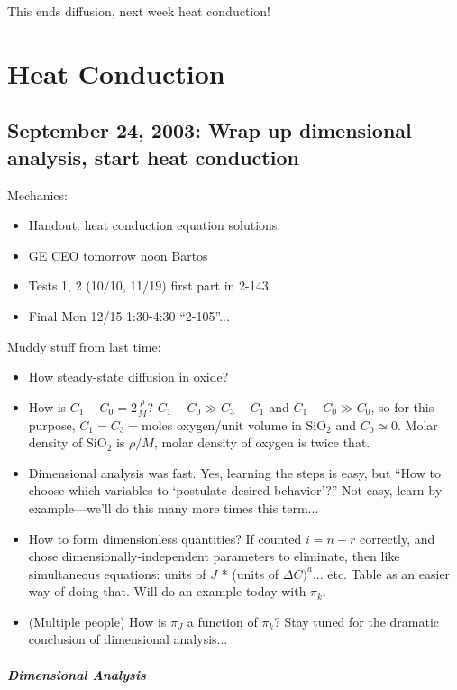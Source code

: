 \documentclass{report}
\begin{document}
\noindent This ends diffusion, next week heat conduction!



\chapter{Heat Conduction}

\section{September 24, 2003: Wrap up dimensional analysis, start heat
  conduction}

Mechanics:
\begin{itemize}
\item Handout: heat conduction equation solutions.
\item GE CEO tomorrow noon Bartos
\item Tests 1, 2 (10/10, 11/19) first part in 2-143.
\item Final Mon 12/15 1:30-4:30 ``2-105''...
\end{itemize}

\noindent Muddy stuff from last time:
\begin{itemize}
\item How steady-state diffusion in oxide?
\item How is $C_1-C_0=2\frac{\rho}{M}$?  $C_1-C_0\gg C_3-C_1$ and $C_1-C_0\gg
  C_0$, so for this purpose, $C_1=C_3=$moles oxygen/unit volume in SiO$_2$ and
  $C_0\simeq 0$.  Molar density of SiO$_2$ is $\rho/M$, molar density of oxygen
  is twice that.
\item Dimensional analysis was fast.  Yes, learning the steps is easy, but
  ``How to choose which variables to `postulate desired behavior'?''  Not
  easy, learn by example---we'll do this many more times this term...
\item How to form dimensionless quantities?  If counted $i=n-r$ correctly, and
  chose dimensionally-independent parameters to eliminate, then like
  simultaneous equations: units of $J$ * (units of $\Delta C)^a$... etc.  Table
  as an easier way of doing that.  Will do an example today with $\pi_k$.
\item (Multiple people) How is $\pi_J$ a function of $\pi_k$?  Stay tuned for
  the dramatic conclusion of dimensional analysis...
\end{itemize}

\paragraph{Dimensional Analysis}
\end{document}

